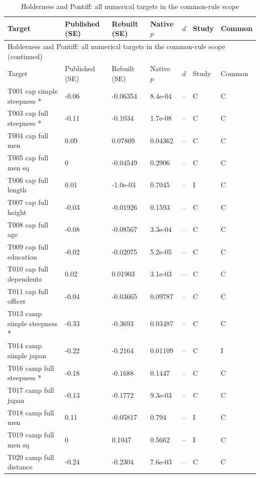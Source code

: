 {\scriptsize\setlength{\tabcolsep}{3pt}\renewcommand{\arraystretch}{1.06}
\begin{longtable}{@{}p{.245\linewidth}p{.17\linewidth}p{.17\linewidth}p{.085\linewidth}p{.060\linewidth}p{.08\linewidth}p{.07\linewidth}@{}}
\caption{Holderness and Pontiff: all numerical targets in the common-rule scope}\label{tab:all:holderness2012}\\
\toprule Target & Published (SE) & Rebuilt (SE) & Native $p$ & $d$ & Study & Common\\\midrule
\endfirsthead\multicolumn{7}{l}{\small Holderness and Pontiff: all numerical targets in the common-rule scope (continued)}\\\toprule Target & Published (SE) & Rebuilt (SE) & Native $p$ & $d$ & Study & Common\\\midrule\endhead\bottomrule\endfoot
T001 cap simple steepness * & -0.06 & -0.06354 & 8.4e-04 & -- & C & C\\
T003 cap full steepness * & -0.11 & -0.1034 & 1.7e-08 & -- & C & C\\
T004 cap full men & 0.09 & 0.07809 & 0.04362 & -- & C & C\\
T005 cap full men sq & 0 & -0.04549 & 0.2906 & -- & C & C\\
T006 cap full length & 0.01 & -1.0e-03 & 0.7045 & -- & I & C\\
T007 cap full height & -0.03 & -0.01926 & 0.1593 & -- & C & C\\
T008 cap full age & -0.08 & -0.08567 & 3.3e-04 & -- & C & C\\
T009 cap full education & -0.02 & -0.02075 & 5.2e-05 & -- & C & C\\
T010 cap full dependents & 0.02 & 0.01903 & 3.1e-03 & -- & C & C\\
T011 cap full officer & -0.04 & -0.03665 & 0.09787 & -- & C & C\\
T013 camp simple steepness * & -0.33 & -0.3693 & 0.03487 & -- & C & C\\
T014 camp simple japan & -0.22 & -0.2164 & 0.01109 & -- & C & I\\
T016 camp full steepness * & -0.18 & -0.1688 & 0.1447 & -- & C & C\\
T017 camp full japan & -0.13 & -0.1772 & 9.3e-03 & -- & C & C\\
T018 camp full men & 0.11 & -0.05817 & 0.794 & -- & I & C\\
T019 camp full men sq & 0 & 0.1047 & 0.5662 & -- & I & C\\
T020 camp full distance & -0.24 & -0.2304 & 7.6e-03 & -- & C & C\\

\end{longtable}}
